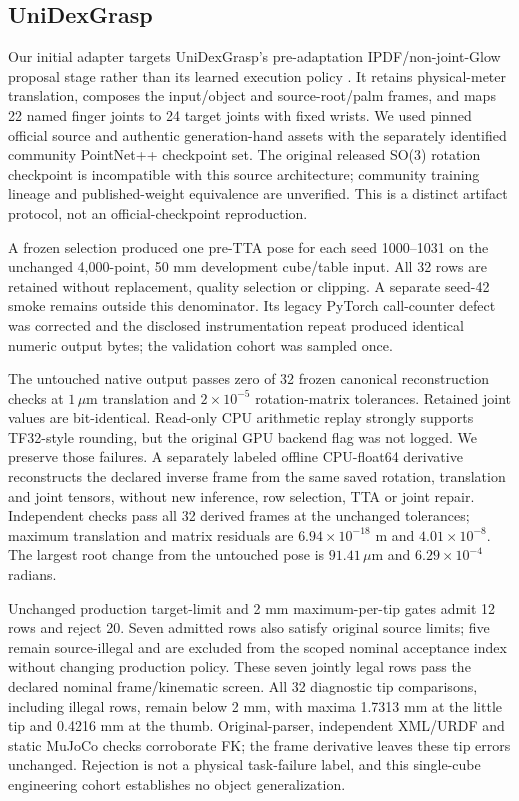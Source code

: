 \documentclass[10pt,letterpaper]{article}
\begin{document}

\subsection{UniDexGrasp}
Our initial adapter targets UniDexGrasp's pre-adaptation IPDF/non-joint-Glow proposal
stage rather than its learned execution policy \cite{unidex}. It retains
physical-meter translation, composes the input/object and source-root/palm
frames, and maps 22 named finger joints to 24 target joints with fixed wrists.
We used pinned official source and authentic generation-hand assets with the
separately identified community PointNet++ checkpoint set. The original released
SO(3) rotation checkpoint is incompatible with this source architecture;
community training lineage and published-weight equivalence are unverified.
This is a distinct artifact protocol, not an official-checkpoint reproduction.

A frozen selection produced one pre-TTA pose for each seed 1000--1031 on the
unchanged 4,000-point, 50 mm development cube/table input. All 32 rows are
retained without replacement, quality selection or clipping. A separate seed-42
smoke remains outside this denominator. Its legacy PyTorch call-counter defect
was corrected and the disclosed instrumentation repeat produced identical
numeric output bytes; the validation cohort was sampled once.

The untouched native output passes zero of 32 frozen canonical reconstruction
checks at $1\,\mu\mathrm{m}$ translation and $2\times10^{-5}$ rotation-matrix
tolerances. Retained joint values are bit-identical. Read-only CPU arithmetic
replay strongly supports TF32-style rounding, but the original GPU backend flag
was not logged. We preserve those failures. A separately labeled offline
CPU-float64 derivative reconstructs the declared inverse frame from the same
saved rotation, translation and joint tensors, without new inference, row
selection, TTA or joint repair. Independent checks pass all 32 derived frames
at the unchanged tolerances; maximum translation and matrix residuals are
$6.94\times10^{-18}$ m and $4.01\times10^{-8}$. The largest root change from
the untouched pose is $91.41\,\mu\mathrm{m}$ and $6.29\times10^{-4}$ radians.

Unchanged production target-limit and 2 mm maximum-per-tip gates admit 12 rows
and reject 20. Seven admitted rows also satisfy original source limits; five
remain source-illegal and are excluded from the scoped nominal acceptance
index without changing production policy. These seven jointly legal rows pass
the declared nominal frame/kinematic screen. All 32 diagnostic tip comparisons,
including illegal rows, remain below 2 mm, with maxima 1.7313 mm at the little
tip and 0.4216 mm at the thumb. Original-parser, independent XML/URDF and static
MuJoCo checks corroborate FK; the frame derivative leaves these tip errors
unchanged. Rejection is not a physical task-failure label, and this single-cube
engineering cohort establishes no object generalization.
\end{document}
